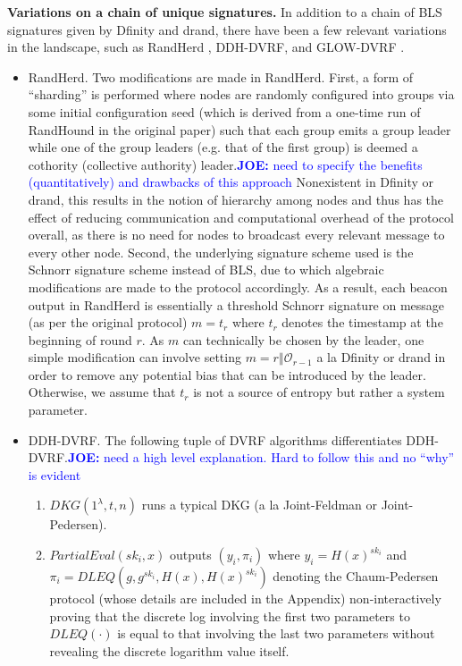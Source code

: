 \documentclass[letterpaper,twocolumn,10pt]{article}
\theoremstyle{definition}
\theoremstyle{remark}
\newcommand{\joenote}[1]{\textcolor{blue}{\textbf{JOE:} #1}}
\begin{document}
\noindent\textbf{Variations on a chain of unique signatures.} In addition to a chain of BLS signatures given by Dfinity and drand, there have been a few relevant variations in the landscape, such as RandHerd \cite{syta2017scalable}, DDH-DVRF, and GLOW-DVRF \cite{galindo2020fully}.
\begin{itemize}
\item RandHerd. Two modifications are made in RandHerd. First, a form of ``sharding'' is performed where nodes are randomly configured into groups via some initial configuration seed (which is derived from a one-time run of RandHound in the original paper) such that each group emits a group leader while one of the group leaders (e.g. that of the first group) is deemed a cothority (collective authority) leader.\joenote{need to specify the benefits (quantitatively) and drawbacks of this approach} Nonexistent in Dfinity or drand, this results in the notion of hierarchy among nodes and thus has the effect of reducing communication and computational overhead of the protocol overall, as there is no need for nodes to broadcast every relevant message to every other node. Second, the underlying signature scheme used is the Schnorr signature scheme instead of BLS, due to which algebraic modifications are made to the protocol accordingly. As a result, each beacon output in RandHerd is essentially a threshold Schnorr signature on message (as per the original protocol) $m = t_r$ where $t_r$ denotes the timestamp at the beginning of round $r$. As $m$ can technically be chosen by the leader, one simple modification can involve setting $m = r \mathbin\Vert \mathcal{O}_{r - 1}$ a la Dfinity or drand in order to remove any potential bias that can be introduced by the leader. Otherwise, we assume that $t_r$ is not a source of entropy but rather a system parameter.
\item DDH-DVRF. The following tuple of DVRF algorithms differentiates DDH-DVRF.\joenote{need a high level explanation. Hard to follow this and no ``why'' is evident}
    \begin{enumerate}
    \item $DKG(1^\lambda, t, n)$ runs a typical DKG (a la Joint-Feldman or Joint-Pedersen).
    \item $PartialEval(sk_i, x)$ outputs $(y_i, \pi_i)$ where $y_i = H(x)^{sk_i}$ and $\pi_i = DLEQ(g, g^{sk_i}, H(x), H(x)^{sk_i})$ denoting the Chaum-Pedersen protocol (whose details are included in the Appendix) non-interactively proving that the discrete log involving the first two parameters to $DLEQ(\cdot)$ is equal to that involving the last two parameters without revealing the discrete logarithm value itself.

\end{enumerate}
\end{itemize}
\end{document}
